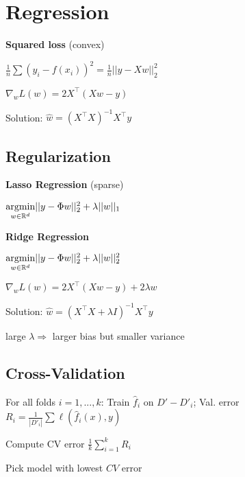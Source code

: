 \section*{Regression}

\textbf{Squared loss} \quad (convex)

\qquad \qquad $\frac{1}{n}\sum (y_i - f(x_i))^2 = \frac{1}{n}||y - X w||_2^2$

\qquad \qquad $\nabla_w L(w) = 2X^\top(Xw -y)$

Solution: $\hat{w} = (X^\top X)^{-1}X^\top y$

\subsection*{Regularization}

\textbf{Lasso Regression} \quad (sparse)

\qquad \qquad $\underset{w \in \mathbb{R}^d}{\text{argmin}} ||y - \Phi w||_2^2 + \lambda ||w||_1$

\textbf{Ridge Regression}

\qquad \qquad $\underset{w \in \mathbb{R}^d}{\text{argmin}} ||y - \Phi w||_2^2 + \lambda ||w||_2^2$

\qquad \qquad $\nabla_w L(w) = 2X^\top(Xw -y) + 2 \lambda w$

Solution: $\hat w = (X^\top X + \lambda I)^{-1} X^\top y$

large $\lambda \Rightarrow$ larger bias but smaller variance 

\subsection*{Cross-Validation}

\begin{compactitem}
	\item For all folds $i = 1,..., k$:  Train $\hat{f}_i$ on $D' - D'_i$; Val. error $R_i = \frac{1}{|D'_i|} \sum \ell(\hat{f}_i(x), y)$
	\item Compute CV error $\frac{1}{k} \sum_{i=1}^k R_i$
	\item Pick model with lowest $CV$ error
\end{compactitem}